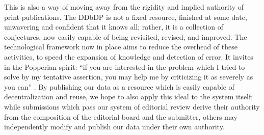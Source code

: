 \documentclass[]{article}
\begin{document}
This is also a way of moving away from the rigidity and implied authority of print publications. The DDbDP is not a fixed resource, finished at some date, unwavering and confident that it knows all; rather, it is a collection of conjectures, now easily capable of being revisited, revised, and improved. The technological framework now in place aims to reduce the overhead of these activities, to speed the expansion of knowledge and detection of error. It invites in the Popperian spirit: “if you are interested in the problem which I tried to solve by my tentative assertion, you may help me by criticizing it as severely as you can” \citep{popper}. By publishing our data as a resource which is easily capable of decentralization and reuse, we hope to also apply this ideal to the system itself; while submissions which pass our system of editorial review derive their authority from the composition of the editorial board and the submitter, others may independently modify and publish our data under their own authority.



\end{document}
